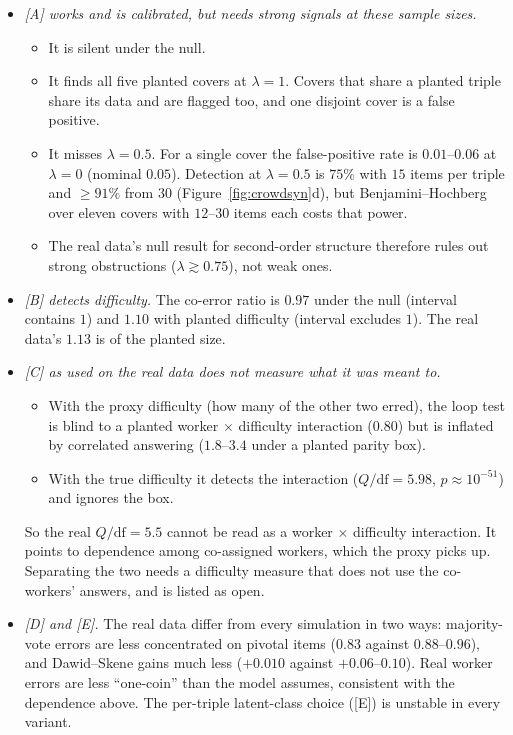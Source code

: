 \documentclass[11pt]{article}
\theoremstyle{definition}
\theoremstyle{remark}
\begin{document}
\begin{itemize}
  \item \emph{[A] works and is calibrated, but needs strong signals at these sample sizes.}
  \begin{itemize}
    \item It is silent under the null.
    \item It finds all five planted covers at $\lambda=1$. Covers that share a planted triple share its data and are flagged too, and one disjoint cover is a false positive.
    \item It misses $\lambda=0.5$. For a single cover the false-positive rate is $0.01$--$0.06$ at $\lambda=0$ (nominal $0.05$). Detection at $\lambda=0.5$ is $75\%$ with $15$ items per triple and $\ge91\%$ from $30$ (Figure~\ref{fig:crowdsyn}d), but Benjamini--Hochberg over eleven covers with $12$--$30$ items each costs that power.
    \item The real data's null result for second-order structure therefore rules out strong obstructions ($\lambda\gtrsim0.75$), not weak ones.
  \end{itemize}
  \item \emph{[B] detects difficulty.} The co-error ratio is $0.97$ under the null (interval contains $1$) and $1.10$ with planted difficulty (interval excludes $1$). The real data's $1.13$ is of the planted size.
  \item \emph{[C] as used on the real data does not measure what it was meant to.}
  \begin{itemize}
    \item With the proxy difficulty (how many of the other two erred), the loop test is blind to a planted worker $\times$ difficulty interaction ($0.80$) but is inflated by correlated answering ($1.8$--$3.4$ under a planted parity box).
    \item With the true difficulty it detects the interaction ($Q/\mathrm{df}=5.98$, $p\approx10^{-51}$) and ignores the box.
  \end{itemize}
  So the real $Q/\mathrm{df}=5.5$ cannot be read as a worker $\times$ difficulty interaction. It points to dependence among co-assigned workers, which the proxy picks up. Separating the two needs a difficulty measure that does not use the co-workers' answers, and is listed as open.
  \item \emph{[D] and [E].} The real data differ from every simulation in two ways: majority-vote errors are less concentrated on pivotal items ($0.83$ against $0.88$--$0.96$), and Dawid--Skene gains much less ($+0.010$ against $+0.06$--$0.10$). Real worker errors are less ``one-coin'' than the model assumes, consistent with the dependence above. The per-triple latent-class choice ([E]) is unstable in every variant.
\end{itemize}
\end{document}
